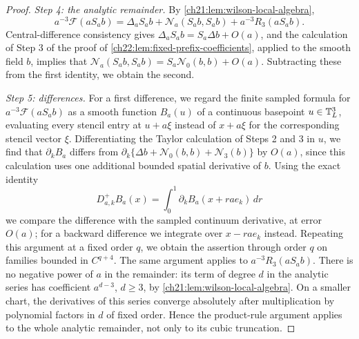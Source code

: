 \begin{proof}
\emph{Step 4: the analytic remainder.} By \cref{ch21:lem:wilson-local-algebra},
\[
 a^{-3}\mathcal F(aS_ab)=\Delta_aS_ab+\mathcal N_a(S_ab,S_ab)+a^{-3}R_3(aS_ab).
\]
Central-difference consistency gives $\Delta_aS_ab=S_a\Delta b+O(a)$, and the calculation of Step 3 of the proof of \cref{ch22:lem:fixed-prefix-coefficients}, applied to the smooth field $b$, implies that $\mathcal N_a(S_ab,S_ab)=S_a\mathcal N_0(b,b)+O(a)$. Subtracting these from the first identity, we obtain the second.

\emph{Step 5: differences.} For a first difference, we regard the finite sampled formula for $a^{-3}\mathcal F(aS_ab)$ as a smooth function $B_a(u)$ of a continuous basepoint $u\in\mathbb T_L^3$, evaluating every stencil entry at $u+a\xi$ instead of $x+a\xi$ for the corresponding stencil vector $\xi$. Differentiating the Taylor calculation of Steps 2 and 3 in $u$, we find that $\partial_kB_a$ differs from $\partial_k\{\Delta b+\mathcal N_0(b,b)+\mathscr N_3(b)\}$ by $O(a)$, since this calculation uses one additional bounded spatial derivative of $b$. Using the exact identity
\[
 D_{a,k}^+B_a(x)=\int_0^1\partial_kB_a(x+rae_k)\,dr
\]
we compare the difference with the sampled continuum derivative, at error $O(a)$; for a backward difference we integrate over $x-rae_k$ instead. Repeating this argument at a fixed order $q$, we obtain the assertion through order $q$ on families bounded in $C^{q+4}$. The same argument applies to $a^{-3}R_3(aS_ab)$. There is no negative power of $a$ in the remainder: its term of degree $d$ in the analytic series has coefficient $a^{d-3}$, $d\ge3$, by \cref{ch21:lem:wilson-local-algebra}. On a smaller chart, the derivatives of this series converge absolutely after multiplication by polynomial factors in $d$ of fixed order. Hence the product-rule argument applies to the whole analytic remainder, not only to its cubic truncation.
\end{proof}

